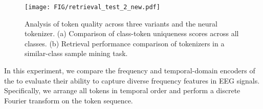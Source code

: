 \begin{figure}[t]
    \centering
    \texttt{[image: FIG/retrieval\_test\_2\_new.pdf]}
    \caption{Analysis of token quality across three \tokenizer variants and the neural tokenizer. (a) Comparison of class-token uniqueness scores across all classes. (b) Retrieval performance comparison of tokenizers in a similar-class sample mining task.}
    
    \label{fig:retrieval_test}
\end{figure}
\label{sec:freq_learning}
In this experiment, we compare the frequency and temporal-domain encoders of the \tokenizer to evaluate their ability to capture diverse frequency features in EEG signals. 
Specifically, we arrange all tokens in temporal order and perform a discrete Fourier transform on the token sequence. 
